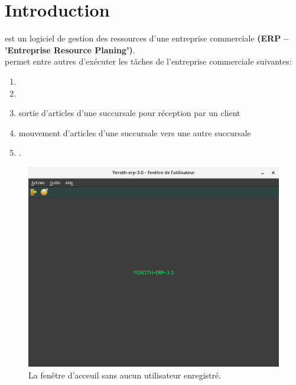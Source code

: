 \chapter{Introduction}\label{chap:introduction}

\yeren est un logiciel de gestion des ressources
d'une entreprise commerciale \textbf{(ERP -- 'Entreprise Resource
Planing')}.\\

\yeren permet entre autres d'ex\'ecuter les t\^aches de l'entreprise
commerciale suivantes:
\begin{enumerate}[1)]
	\item {}
	\item {}
	\item {} sortie d'articles
		d'une succursale pour r\'eception par un client
	\item {} mouvement d'articles
		d'une succursale vers une autre succursale
	\item {}.\\
\end{enumerate} 


\begin{figure}[!htbp]
\centering
\includegraphics[scale=0.63]{images/yeren-fenetre-principale.png}
\caption{La fen\^etre d'acceuil sans aucun utilisateur enregistr\'e.}
\label{fig:fenetre-principale-utilisateur-non-enregistre}
\end{figure}

